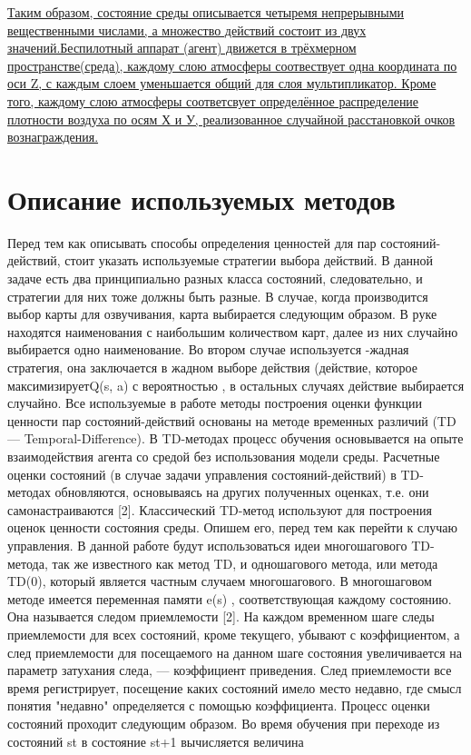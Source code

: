 \documentclass[12pt, a4paper]{report}
\theoremstyle{definition}
\theoremstyle{plain}
\theoremstyle{remark}
\theoremstyle{remark}
\theoremstyle{definition}
\begin{document}
\underline{Таким образом, состояние среды описывается четыремя непрерывными вещественными числами, а множество действий состоит из двух значений.Беспилотный аппарат (агент) движется в трёхмерном пространстве(среда), каждому слою атмосферы соотвествует одна координата по оси Z, с каждым слоем уменьшается общий для слоя мультипликатор. Кроме того, каждому слою атмосферы соответсвует определённое распределение плотности воздуха по осям Х и У, реализованное случайной расстановкой очков вознаграждения.}

\section{Описание используемых методов}

Перед тем как описывать способы определения ценностей для пар состояний-действий, стоит указать используемые стратегии выбора действий. В данной задаче есть два принципиально разных класса состояний, следовательно, и стратегии для них тоже должны быть разные. В случае, когда производится выбор карты для озвучивания, карта выбирается следующим образом. В руке находятся наименования с наибольшим количеством карт,
далее из них случайно выбирается одно наименование. Во втором случае используется -жадная стратегия, она заключается в жадном выборе действия (действие, которое максимизируетQ(s, a)  с вероятностью , в остальных случаях действие выбирается случайно. Все используемые в работе методы построения оценки функции ценности пар состояний-действий основаны на методе временных различий (TD — Temporal-Difference). В TD-методах процесс обучения основывается на опыте взаимодействия агента со средой без использования модели среды. Расчетные оценки состояний (в случае задачи управления состояний-действий) в TD-методах обновляются, основываясь на других полученных оценках, т.е. они самонастраиваются [2]. Классический TD-метод используют для построения оценок ценности состояния среды. Опишем его, перед тем как перейти к случаю управления. В данной работе будут использоваться идеи многошагового TD-метода, так же известного как метод TD, и одношагового метода, или метода TD(0), который является частным случаем многошагового. В многошаговом методе имеется переменная памяти e(s) , соответствующая каждому состоянию. Она называется следом приемлемости [2]. На каждом временном шаге следы приемлемости для всех состояний, кроме текущего, убывают с коэффициентом, а след приемлемости для посещаемого на данном шаге состояния увеличивается на параметр затухания следа,  — коэффициент приведения. След приемлемости все время регистрирует, посещение каких состояний имело место недавно, где смысл понятия "недавно" определяется с помощью коэффициента. Процесс оценки состояний проходит следующим образом. Во время обучения при переходе из состояний st в состояние st+1 вычисляется величина 
\end{document}
